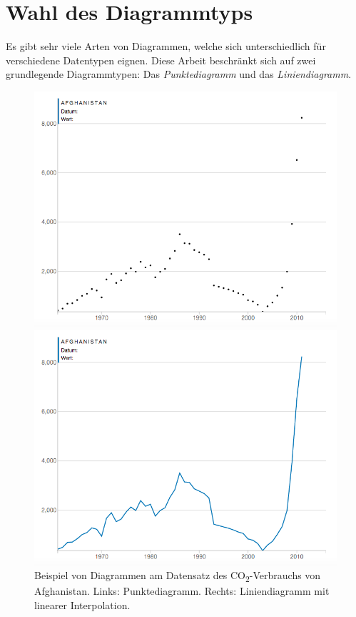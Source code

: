 \section{Wahl des Diagrammtyps}

Es gibt sehr viele Arten von Diagrammen, welche sich unterschiedlich für verschiedene Datentypen eignen. 
Diese Arbeit beschränkt sich auf zwei grundlegende Diagrammtypen: Das \textit{Punktediagramm} und das \textit{Liniendiagramm}.

\begin{figure}[!htbp]
	\centering
	\begin{minipage}{0.45\textwidth}
		\centering
		\includegraphics[width=\linewidth]{images/scatterplot_no_interpolation}
	\end{minipage}\hfill
	\begin{minipage}{0.45\textwidth}
		\centering
		\includegraphics[width=\linewidth]{images/scatterplot_interpolated}
	\end{minipage}
	\caption[Vergleich zwischen Punktediagramm und Liniendiagramm]{Beispiel von Diagrammen am Datensatz des CO\textsubscript{2}-Verbrauchs von Afghanistan. Links: Punktediagramm. Rechts: Liniendiagramm mit linearer Interpolation.}
	\label{fig:scatterplot}
\end{figure}

